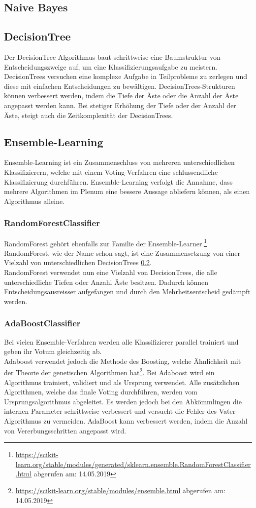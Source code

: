 \subsection{Naive Bayes}
\subsection{DecisionTree}\label{sec:trees}
Der DecisionTree-Algorithmus baut schrittweise eine Baumstruktur von Entscheidungszweige auf, um eine Klassifizierungsaufgabe zu meistern.
DecisionTrees versuchen eine komplexe Aufgabe in Teilprobleme zu zerlegen und diese mit einfachen Entscheidungen zu bewältigen.
DecisionTrees-Strukturen können verbessert werden, indem die Tiefe der Äste oder die Anzahl der Äste angepasst werden kann.
Bei stetiger Erhöhung der Tiefe oder der Anzahl der Äste, steigt auch die Zeitkomplexität der DecisionTrees\cite{safavian1991survey}.
\subsection{Ensemble-Learning}
Ensemble-Learning ist ein Zusammenschluss von mehreren unterschiedlichen Klassifizierern, welche mit einem Voting-Verfahren eine schlussendliche Klassifizierung durchführen.
Ensemble-Learning verfolgt die Annahme, dass mehrere Algorithmen im Plenum eine bessere Aussage abliefern können, als einen Algorithmus alleine\cite{freund1999short}.
\subsubsection{RandomForestClassifier}
RandomForest gehört ebenfalls zur Familie der Ensemble-Learner.\footnote{\url{https://scikit-learn.org/stable/modules/generated/sklearn.ensemble.RandomForestClassifier.html} abgerufen am: 14.05.2019}
RandomForest, wie der Name schon sagt, ist eine Zusammensetzung von einer Vielzahl von unterschiedlichen DecisionTrees \cref{sec:trees}.\\
RandomForest verwendet nun eine Vielzahl von DecisionTrees, die alle unterschiedliche Tiefen oder Anzahl Äste besitzen.
Dadurch können Entscheidungsausreisser aufgefangen und durch den Mehrheitsentscheid gedämpft werden\cite{liaw2002classification}.
\subsubsection{AdaBoostClassifier}
Bei vielen Ensemble-Verfahren werden alle Klassifizierer parallel trainiert und geben ihr Votum gleichzeitig ab.\\
Adaboost verwendet jedoch die Methode des \glqq Boosting\grqq{}, welche Ähnlichkeit mit der Theorie der genetischen Algorithmen hat\footnote{\url{https://scikit-learn.org/stable/modules/ensemble.html} abgerufen am: 14.05.2019}.
Bei Adaboost wird ein Algorithmus trainiert, validiert und als Ursprung verwendet. Alle zusätzlichen Algorithmen, welche das finale Voting durchführen, werden vom Ursprungsalgorithmus abgeleitet.
Es werden jedoch bei den Abkömmlingen die internen Parameter schrittweise verbessert und versucht die Fehler des \glqq Vater-Algorithmus\grqq{} zu vermeiden.
AdaBoost kann verbessert werden, indem die Anzahl von Vererbungsschritten angepasst wird\cite{freund1999short}.
